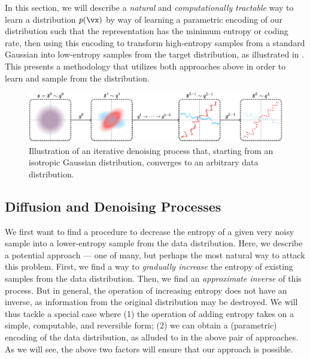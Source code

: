 \documentclass[../../book-main.tex]{subfiles}
\begin{document}
In this section, we will describe a \textit{natural} and \textit{computationally tractable} way to learn a distribution \(p(\vx)\) by way of learning a parametric encoding of our distribution such that the representation has the minimum entropy or coding rate, then using this encoding to transform high-entropy samples from a standard Gaussian into low-entropy samples from the target distribution, as illustrated in . This presents a methodology that utilizes both approaches above in order to learn and sample from the distribution.

\begin{figure}[t]
	\centering
	\includegraphics[width=\linewidth]{chapters/chapter3/figs/diffusion_pipeline-2.pdf}
	\caption{Illustration of an iterative denoising process that, starting from an isotropic Gaussian distribution, converges to an arbitrary data distribution. }
	\label{fig:diffusion-chapter3}
\end{figure}

\subsection{Diffusion and Denoising Processes} \label{sub:intro_diffusion_denoising}

We first want to find a procedure to decrease the entropy of a given very noisy sample into a lower-entropy sample from the data distribution. Here, we describe a potential approach --- one of many, but perhaps the most natural way to attack this problem. First, we find a way to \textit{gradually increase} the entropy of existing samples from the data distribution. Then, we find an \textit{approximate inverse} of this process. But in general, the operation of increasing entropy does not have an inverse, as information from the original distribution may be destroyed. We will thus tackle a special case where (1) the operation of adding entropy takes on a simple, computable, and reversible form; (2) we can obtain a (parametric) encoding of the data distribution, as alluded to in the above pair of approaches. As we will see, the above two factors will ensure that our approach is possible.
\end{document}
